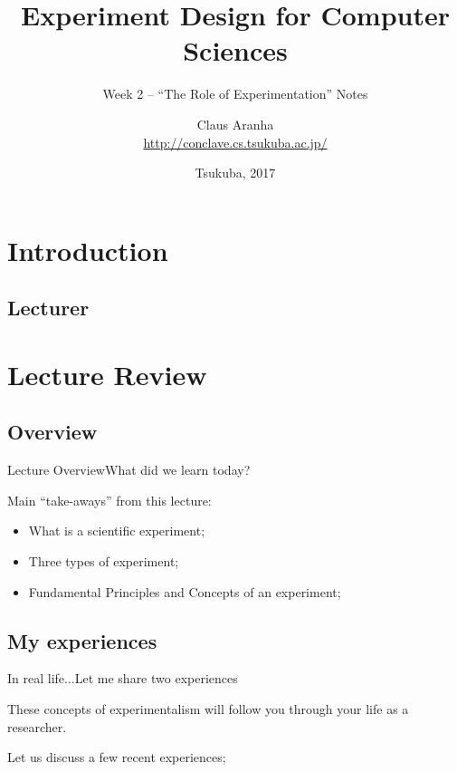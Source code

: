 \documentclass[t]{beamer}
\title[]{Experiment Design for Computer Sciences}
\subtitle[]{Week 2 -- ``The Role of Experimentation'' Notes}
\author[]{Claus Aranha\\{\footnotesize \url{http://conclave.cs.tsukuba.ac.jp/}}}
\institute{Computer Science Department}
\date{\scriptsize Tsukuba, 2017}
\begin{document}
\section{Introduction}
\subsection{Lecturer}
\begin{frame}
  \titlepage
\end{frame}

\section{Lecture Review}
\subsection{Overview}
\begin{ftst}
  {Lecture Overview}{What did we learn today?}

  Main ``take-aways'' from this lecture:

  \begin{itemize}
  \item What is a scientific experiment;
  \item Three types of experiment;
  \item Fundamental Principles and Concepts of an experiment;
  \end{itemize}
\end{ftst}

\subsection{My experiences}

\begin{ftst}
  {In real life...}{Let me share two experiences}
  
  These concepts of experimentalism will follow you through your life
  as a researcher.

  \vone

  Let us discuss a few recent experiences;
\end{ftst}
\end{document}
